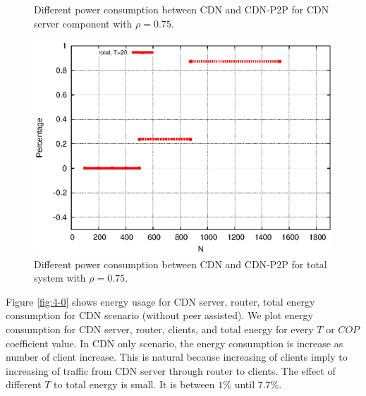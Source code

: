 \documentclass[JIP]{ipsj}
\begin{document}
\begin{figure}[ht!]
\begin{minipage}[b]{0.4\linewidth}
	\caption{Different power consumption between CDN and CDN-P2P for CDN server component with $\rho=0.75$.}
	\label{fig:diffs1}
\end{minipage}
\hfill
\begin{minipage}[b]{0.4\linewidth}
	\includegraphics[scale=0.5]{graphs/diff-3-total.eps}
	\caption{Different power consumption between CDN and CDN-P2P for total system with $\rho=0.75$.}
	\label{fig:diffs2}
\end{minipage}
\label{fig:maindiff}
\end{figure}


Figure \ref{fig:4-0} shows energy usage for CDN server, router, total energy consumption for CDN scenario (without peer assisted).
We plot energy consumption for CDN server, router, clients, and total energy for every $T$ or $COP$ coefficient value.
In CDN only scenario, the energy consumption is increase as number of client increase.  
This is natural because increasing of clients imply to increasing of traffic from CDN server through router to clients.
The effect of different $T$ to total energy is small.  
It is between $1\%$ until $7.7\%$.
\end{document}
